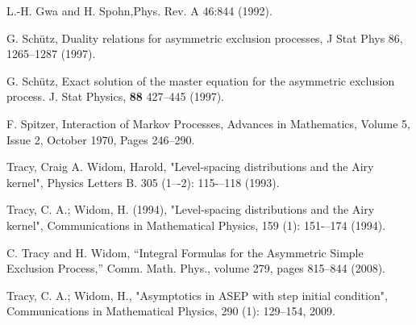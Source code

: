 \documentclass{ximera}
\begin{document}
\begin{thebibliography}{10}
 L.-H. Gwa and H. Spohn,Phys. Rev. A 46:844 (1992).

 G. Sch\"{u}tz, Duality relations for asymmetric exclusion processes, J Stat Phys 86, 1265–1287 (1997).

 G. Sch\"{u}tz, Exact solution of the master equation
for the asymmetric exclusion process. J. Stat Physics, \textbf{88} 427--445 (1997).

 F. Spitzer, Interaction of Markov Processes, 
Advances in Mathematics, Volume 5, Issue 2, October 1970, Pages 246--290.

  Tracy, Craig A. Widom, Harold, "Level-spacing distributions and the Airy kernel", 
Physics Letters B. 305 (1–-2): 115-–118 (1993). 

 Tracy, C. A.; Widom, H. (1994), "Level-spacing distributions and the Airy kernel", 
Communications in Mathematical Physics, 159 (1): 151-–174 (1994).

 C. Tracy and H. Widom, ``Integral Formulas for the Asymmetric 
Simple Exclusion Process,'' Comm. Math. Phys., volume 279, 
pages 815--844 (2008).

 Tracy, C. A.; Widom, H., "Asymptotics in ASEP with step initial condition", 
Communications in Mathematical Physics, 290 (1): 129–154, 2009.

\end{thebibliography}
\end{document}
